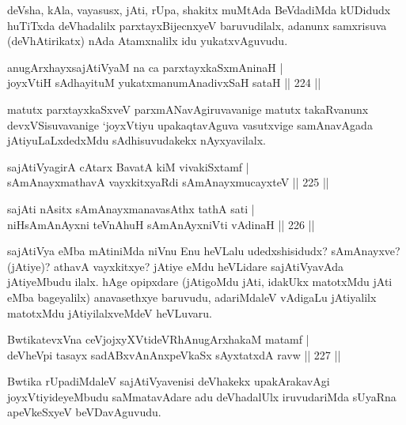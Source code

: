 \begin{artha}
deVsha, kAla, vayasusx, jAti, rUpa, shakitx muMtAda BeVdadiMda kUDidudx huTiTxda deVhadalilx parxtayxBijecnxyeV baruvudilalx, adanunx samxrisuva (deVhAtirikatx) nAda Atamxnalilx idu yukatxvAguvudu.
\end{artha}

\begin{shl}
anugArxhayxsajAtiVyaM na ca parxtayxkaSxmAninaH | \\
joyxVtiH sAdhayituM yukatxmanumAnadivxSaH sataH \hfill ||  224 ||  
\end{shl}

\begin{artha}
matutx parxtayxkaSxveV parxmANavAgiruvavanige matutx takaRvanunx devxVSisuvavanige `joyxVtiyu upakaqtavAguva vasutxvige samAnavAgada jAtiyuLaLxdedxMdu sAdhisuvudakekx nAyxyavilalx.
\end{artha}

\begin{shl}
sajAtiVyagirA cAtarx BavatA kiM vivakiSxtamf | \\
sAmAnayxmathavA vayxkitxyaRdi sAmAnayxmucayxteV \hfill ||  225 ||  
\end{shl}
				
\begin{shl}
sajAti nAsitx sAmAnayxmanavasAthx tathA sati | \\
niHsAmAnAyxni teVnA\s \s huH sAmAnAyxniVti vAdinaH \hfill ||  226 || 
\end{shl}

\begin{artha}
sajAtiVya eMba mAtiniMda niVnu Enu heVLalu udedxshisidudx? sAmAnayxve? (jAtiye)? athavA vayxkitxye? jAtiye eMdu heVLidare sajAtiVyavAda jAtiyeMbudu ilalx. hAge opipxdare (jAtigoMdu jAti, idakUkx matotxMdu jAti eMba bageyalilx) anavasethxye baruvudu, adariMdaleV vAdigaLu jAtiyalilx matotxMdu jAtiyilalxveMdeV heVLuvaru.
\end{artha}

\begin{shl}
BwtikatevxVna ceVjojxyXVtideVRhAnugArxhakaM matamf | \\
deVheV\s pi tasayx sadABxvAnAnxpeVkaSx sAyxtatxdA ravw \hfill ||  227 ||  
\end{shl}

\begin{artha}
Bwtika rUpadiMdaleV sajAtiVyavenisi deVhakekx upakArakavAgi joyxVtiyideyeMbudu saMmatavAdare adu deVhadalUlx iruvudariMda sUyaRna apeVkeSxyeV beVDavAguvudu.
\end{artha}


